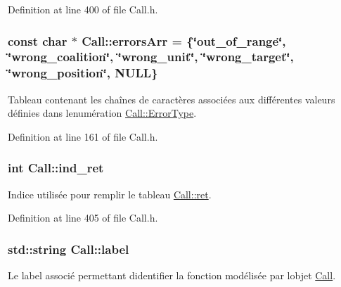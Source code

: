 Definition at line 400 of file Call.\+h.

\subsubsection[{\texorpdfstring{errors\+Arr}{errorsArr}}]{\setlength{\rightskip}{0pt plus 5cm}const char $\ast$ Call\+::errors\+Arr = \{\char`\"{}out\+\_\+of\+\_\+range\char`\"{}, \char`\"{}wrong\+\_\+coalition\char`\"{}, \char`\"{}wrong\+\_\+unit\char`\"{}, \char`\"{}wrong\+\_\+target\char`\"{}, \char`\"{}wrong\+\_\+position\char`\"{}, N\+U\+LL\}\hspace{0.3cm}{\ttfamily [static]}}\hypertarget{class_call_a9b4594fe997fce2b0155af42d47af07a}{}\label{class_call_a9b4594fe997fce2b0155af42d47af07a}
Tableau contenant les chaînes de caractères associées aux différentes valeurs définies dans l\textquotesingle{}enumération \hyperlink{class_call_ade833a08ce215aaa4121102f3448c898}{Call\+::\+Error\+Type}. 

Definition at line 161 of file Call.\+h.

\subsubsection[{\texorpdfstring{ind\+\_\+ret}{ind_ret}}]{\setlength{\rightskip}{0pt plus 5cm}int Call\+::ind\+\_\+ret\hspace{0.3cm}{\ttfamily [protected]}}\hypertarget{class_call_ac61426df38580506f015d44c687c2ee8}{}\label{class_call_ac61426df38580506f015d44c687c2ee8}
Indice utilisée pour remplir le tableau \hyperlink{class_call_a634f1033a7d282e03578a3d0fd2823f8}{Call\+::ret}. 

Definition at line 405 of file Call.\+h.

\subsubsection[{\texorpdfstring{label}{label}}]{\setlength{\rightskip}{0pt plus 5cm}std\+::string Call\+::label\hspace{0.3cm}{\ttfamily [protected]}}\hypertarget{class_call_ad6b8343d530798fdb48407b3f2489ae7}{}\label{class_call_ad6b8343d530798fdb48407b3f2489ae7}
Le label associé permettant d\textquotesingle{}identifier la fonction modélisée par l\textquotesingle{}objet \hyperlink{class_call}{Call}. 


